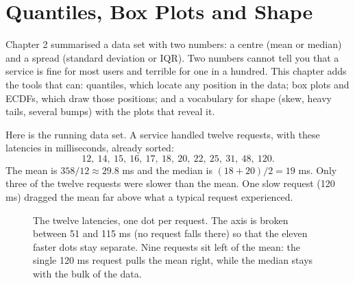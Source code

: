 \chapter{Quantiles, Box Plots and Shape}
\label{ch:quantiles}

Chapter 2 summarised a data set with two numbers: a centre (mean or median) and a
spread (standard deviation or IQR). Two numbers cannot tell you that a service is fine
for most users and terrible for one in a hundred. This chapter adds the tools that can:
quantiles, which locate any position in the data; box plots and ECDFs, which draw
those positions; and a vocabulary for shape (skew, heavy tails, several bumps) with
the plots that reveal it.

Here is the running data set. A service handled twelve requests, with these
latencies in milliseconds, already sorted:
\[
  12,\ 14,\ 15,\ 16,\ 17,\ 18,\ 20,\ 22,\ 25,\ 31,\ 48,\ 120.
\]
The mean is $358/12 \approx 29.8$ ms and the median is $(18+20)/2 = 19$ ms. Only
three of the twelve requests were slower than the mean. One slow request (120 ms)
dragged the mean far above what a typical request experienced.

\begin{figure}[H]
\centering
{}
\caption{The twelve latencies, one dot per request. The axis is broken between 51 and 115 ms
(no request falls there) so that the eleven faster dots stay separate. Nine requests sit left
of the mean: the single 120 ms request pulls the mean right, while the median stays with the
bulk of the data.}
\label{fig:quantiles-dotplot}
\end{figure}

